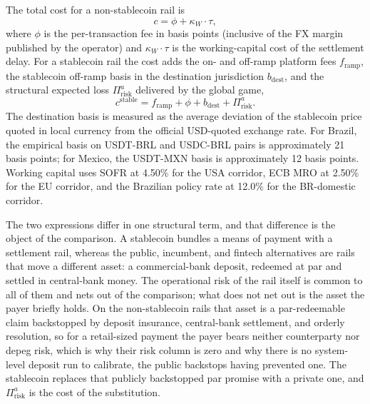 The total cost for a non-stablecoin rail is
\begin{equation}\label{eq:total_cost_nonstable}
c = \phi + \kappa_W \cdot \tau,
\end{equation}
where $\phi$ is the per-transaction fee in basis points (inclusive of the FX margin published by the operator) and $\kappa_W \cdot \tau$ is the working-capital cost of the settlement delay. For a stablecoin rail the cost adds the on- and off-ramp platform fees $f_{\text{ramp}}$, the stablecoin off-ramp basis in the destination jurisdiction $b_{\text{dest}}$, and the structural expected loss $\Pi_{\text{risk}}^{a}$ delivered by the global game,
\begin{equation}\label{eq:total_cost_stable}
c^{\text{stable}} = f_{\text{ramp}} + \phi + b_{\text{dest}} + \Pi_{\text{risk}}^{a}.
\end{equation}
The destination basis is measured as the average deviation of the stablecoin price quoted in local currency from the official USD-quoted exchange rate. For Brazil, the empirical basis on USDT-BRL and USDC-BRL pairs is approximately 21 basis points; for Mexico, the USDT-MXN basis is approximately 12 basis points. Working capital uses SOFR at 4.50\% for the USA corridor, ECB MRO at 2.50\% for the EU corridor, and the Brazilian policy rate at 12.0\% for the BR-domestic corridor.

The two expressions differ in one structural term, and that difference is the object of the comparison. A stablecoin bundles a means of payment with a settlement rail, whereas the public, incumbent, and fintech alternatives are rails that move a different asset: a commercial-bank deposit, redeemed at par and settled in central-bank money. The operational risk of the rail itself is common to all of them and nets out of the comparison; what does not net out is the asset the payer briefly holds. On the non-stablecoin rails that asset is a par-redeemable claim backstopped by deposit insurance, central-bank settlement, and orderly resolution, so for a retail-sized payment the payer bears neither counterparty nor depeg risk, which is why their risk column is zero and why there is no system-level deposit run to calibrate, the public backstops having prevented one. The stablecoin replaces that publicly backstopped par promise with a private one, and $\Pi_{\text{risk}}^{a}$ is the cost of the substitution.

